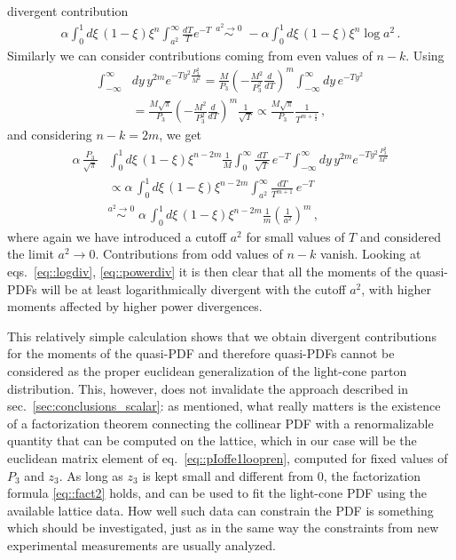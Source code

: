 divergent contribution
\begin{align}
\label{eq::logdiv}
	\alpha\int_0^1 d\xi\, 
	\left(1-\xi\right) \xi^n \int_{a^2}^{\infty} \frac{dT}{T}e^{-T}\,\,
	\stackrel{a^2\rightarrow 0}{\sim}\,\, 
	- \alpha\int_0^1 d\xi\, \left(1-\xi\right) \xi^n \log a^2\, .
\end{align}
Similarly we can consider contributions coming from even values of $n-k$. Using 
\begin{align}
	\int_{-\infty}^{\infty}
	&dy\, y^{2m} e^{-T y^2 \frac{P_3^2}{M^2}} = 
		\frac{M}{P_3} \left(-\frac{M^2}{P_3^2}\frac{d}{dT}\right)^m 
		\int_{-\infty}^{\infty} dy\,e^{-T y^2} \nonumber \\
	&= \frac{M\sqrt{\pi}}{P_3} 
	\left(-\frac{M^2}{P_3^2}\frac{d}{dT}\right)^m \frac{1}{\sqrt{T}}  
	\propto \frac{M \sqrt{\pi}}{P_3} \frac{1}{T^{m + \frac{1}{2}}}\, ,
\end{align}
and considering $n-k = 2m$, we get
\begin{align}
	\label{eq::powerdiv}
	\alpha\, \frac{P_3}{\sqrt{\pi}}
	&\int_0^1 d\xi\, \left(1-\xi\right) \xi^{n-2m} \frac{1}{M}
		\int_0^{\infty} \frac{dT}{\sqrt{T}}\, e^{-T } 
		\int_{-\infty}^{\infty} dy\, y^{2m} e^{-T y^2 \frac{P_3^2}{M^2}} \nonumber \\
	&\propto \alpha\, \int_0^1 d\xi\, \left(1-\xi\right) \xi^{n-2m}
		\int_{a^2}^{\infty} \frac{dT}{T^{m +1}}\, e^{-T} \,\, \nonumber \\
		&\stackrel{a^2\rightarrow 0}{\sim}\,\, 
		\alpha\, \int_0^1 d\xi\, \left(1-\xi\right) \xi^{n-2m}
		\frac{1}{m} \left(\frac{1}{a^2} \right)^{m}\, ,
\end{align}
where again we have introduced a cutoff $a^2$ for small values of $T$ and
considered the limit $a^2 \rightarrow 0$. Contributions from odd values of $n-k$
vanish. Looking at eqs.~\eqref{eq::logdiv}, \eqref{eq::powerdiv} it is then
clear that all the moments of the quasi-PDFs will be at least logarithmically
divergent with the cutoff $a^2$, with higher moments affected by higher power
divergences.

This relatively simple calculation shows that we obtain divergent contributions
for the moments of the quasi-PDF and therefore quasi-PDFs cannot be considered
as the proper euclidean generalization of the light-cone parton distribution.
This, however, does not invalidate the approach described in
sec.~\ref{sec:conclusions_scalar}: as mentioned, what really matters is the existence
of a factorization theorem connecting the collinear PDF with a renormalizable
quantity that can be computed on the lattice, which in our case will be the
euclidean matrix element of eq.~\eqref{eq::pIoffe1loopren}, computed for fixed
values of $P_3$ and $z_3$. As long as $z_3$ is kept small and different from
$0$, the factorization formula \eqref{eq::fact2} holds, and can be used to fit
the light-cone PDF using the available lattice data. How well such data can
constrain the PDF is something which should be investigated, just as in the same
way the constraints from new experimental measurements are usually analyzed.